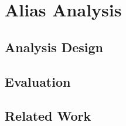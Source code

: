 
\chapter{Alias Analysis}
\label{chap:alias}

\section{Analysis Design}

\section{Evaluation}

\section{Related Work}

